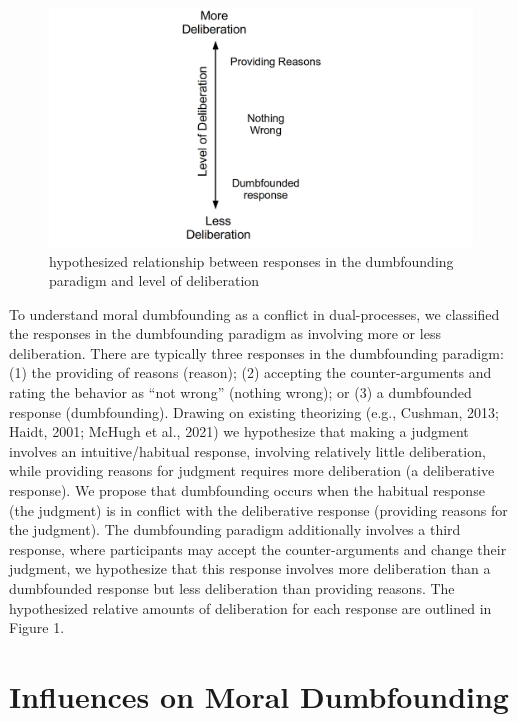 \documentclass[
  american,
  man,floatsintext]{apa7}
\begin{document}
\begin{figure}
\centering
\includegraphics{../resources/images/responses_figure2.png}
\caption{hypothesized relationship between responses in the dumbfounding paradigm and level of deliberation}
\end{figure}

To understand moral dumbfounding as a conflict in dual-processes, we classified the responses in the dumbfounding paradigm as involving more or less deliberation. There are typically three responses in the dumbfounding paradigm: (1) the providing of reasons (reason); (2) accepting the counter-arguments and rating the behavior as \enquote{not wrong} (nothing wrong); or (3) a dumbfounded response (dumbfounding). Drawing on existing theorizing (e.g., Cushman, 2013; Haidt, 2001; McHugh et al., 2021) we hypothesize that making a judgment involves an intuitive/habitual response, involving relatively little deliberation, while providing reasons for judgment requires more deliberation (a deliberative response). We propose that dumbfounding occurs when the habitual response (the judgment) is in conflict with the deliberative response (providing reasons for the judgment). The dumbfounding paradigm additionally involves a third response, where participants may accept the counter-arguments and change their judgment, we hypothesize that this response involves more deliberation than a dumbfounded response but less deliberation than providing reasons. The hypothesized relative amounts of deliberation for each response are outlined in Figure 1.

\hypertarget{influences-on-moral-dumbfounding}{%
\section{Influences on Moral Dumbfounding}\label{influences-on-moral-dumbfounding}}
\end{document}
